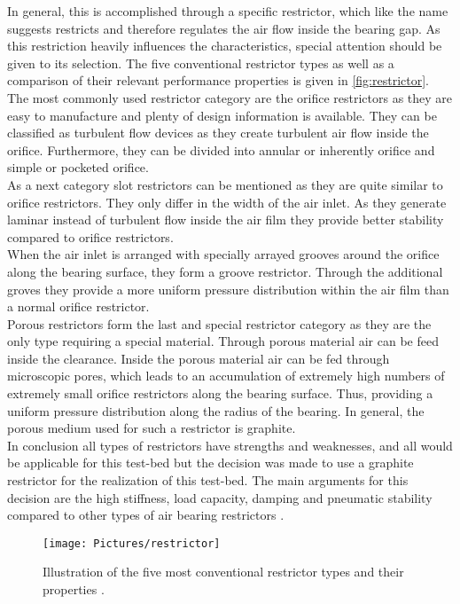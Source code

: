 In general, this is accomplished through a specific restrictor, which like the name suggests restricts and therefore regulates the air flow inside the bearing gap. As this restriction heavily influences the characteristics, special attention should be given to its selection. The five conventional restrictor types as well as a comparison of their relevant performance properties is given in \autoref{fig:restrictor}.\\
The most commonly used restrictor category are the orifice restrictors as they are easy to manufacture and plenty of design information is available. They can be classified as turbulent flow devices as they create turbulent air flow inside the orifice. Furthermore, they can be divided into annular or inherently orifice and simple or pocketed orifice.\\
As a next category slot restrictors can be mentioned as they are quite similar to orifice restrictors. They only differ in the width of the air inlet. As they generate laminar instead of turbulent flow inside the air film they provide better stability compared to orifice restrictors.\\
When the air inlet is arranged with specially arrayed grooves around the orifice along the bearing surface, they form a groove restrictor. Through the additional groves they provide a more uniform pressure distribution within the air film than a normal orifice restrictor.\\
Porous restrictors form the last and special restrictor category as they are the only type requiring a special material. Through porous material air can be feed inside the clearance. Inside the porous material air can be fed through microscopic pores, which leads to an accumulation of extremely high numbers of extremely small orifice restrictors along the bearing surface. Thus, providing a uniform pressure distribution along the radius of the bearing. In general, the porous medium used for such a restrictor is graphite.\\ 
In conclusion all types of restrictors have strengths and weaknesses, and all would be applicable for this test-bed but the decision was made to use a graphite restrictor for the realization of this test-bed. The main arguments for this decision are the high stiffness, load capacity, damping and pneumatic stability compared to other types of air bearing restrictors \cite{Hamrock.1991}\cite{Gao.2019}\cite{NewWayAirBearingsInc..2006}.

\begin{figure}[H]
{\centering
\texttt{[image: Pictures/restrictor]}
\caption{Illustration of the five most conventional restrictor types and their properties \cite{Gao.2019}.}
\label{fig:restrictor}
}
\end{figure}


